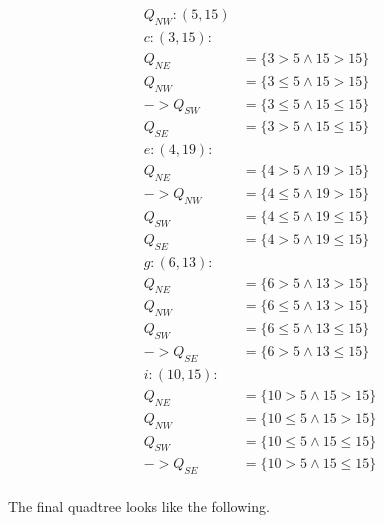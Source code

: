 \documentclass{report}
\begin{document}
\begin{multicols}{2}
\begin{equation*}
        \begin{split}
        Q_{NW} : (5, 15) & \\
        c : (3, 15) : \\
             Q_{NE} & = \{3 > 5 \land 15 > 15\} \\
             Q_{NW} & = \{3 \leq 5 \land 15 > 15\} \\
             ->Q_{SW} & = \{3 \leq 5 \land 15 \leq 15\} \\
             Q_{SE} & = \{3 > 5 \land 15 \leq 15\} \\
        e : (4, 19) : \\
             Q_{NE} & = \{4 > 5 \land 19 > 15\} \\
             ->Q_{NW} & = \{4 \leq 5 \land 19 > 15\} \\
             Q_{SW} & = \{4 \leq 5 \land 19 \leq 15\} \\
             Q_{SE} & = \{4 > 5 \land 19 \leq 15\} \\
        g : (6, 13) : \\
             Q_{NE} & = \{6 > 5 \land 13 > 15\} \\
             Q_{NW} & = \{6 \leq 5 \land 13 > 15\} \\
             Q_{SW} & = \{6 \leq 5 \land 13 \leq 15\} \\
             ->Q_{SE} & = \{6 > 5 \land 13 \leq 15\} \\
          i : (10, 15) : \\
             Q_{NE} & = \{10 > 5 \land 15 > 15\} \\
             Q_{NW} & = \{10 \leq 5 \land 15 > 15\} \\
             Q_{SW} & = \{10 \leq 5 \land 15 \leq 15\} \\
             ->Q_{SE} & = \{10 > 5 \land 15 \leq 15\} \\
        \end{split}
      \end{equation*}
  \end{multicols}
  
  The final quadtree looks like the following.
  
  \vspace{1cm}
  
\end{document}
